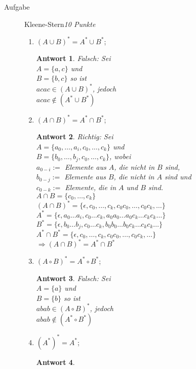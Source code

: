 \documentclass[a4paper,twoside,12pt,fleqn]{article}
\newcounter{AUFGNR}
\newcommand{\AUFGABE}[2]{\vspace{0.3cm}\item[Aufgabe~\arabic{AUFGNR}]\stepcounter{AUFGNR} #1\hfill\emph{#2}}
\newtheorem*{antwort}{Antwort}
\begin{document}
\begin{description}
\AUFGABE{Kleene-Stern}{10 Punkte}
\begin{enumerate}
  \item $(A \cup B)^* = A^* \cup B^*$;
    \begin{antwort}
      Falsch: Sei\\
      $A = \{a,c\}$ und\\
      $B = \{b,c\}$ so ist\\
      $acac \in (A \cup B)^*$, jedoch\\
      $acac \notin (A^* \cup B^*)$
    \end{antwort}
  \item $(A \cap B)^* = A^* \cap B^*$;
    \begin{antwort}
      Richtig: Sei\\
      $A = \{a_0, \dots, a_i, c_0, \dots, c_k\}$ und\\
      $B = \{b_0, \dots, b_j, c_0, \dots, c_k\}$, wobei\\
      $a_{0-i} :=$ Elemente aus $A$, die nicht in $B$ sind,\\
      $b_{0-j} :=$ Elemente aus $B$, die nicht in $A$ sind und\\
      $c_{0-k} :=$ Elemente, die in $A$ und $B$ sind.\\
      $A \cap B = \{c_0, \dots, c_k\}$\\
      $(A \cap B)^* = \{\epsilon, c_0, \dots, c_k, c_0c_0, \dots, c_0c_k, \dots\}$\\
      $A^* = \{\epsilon, a_0 \dots a_i, c_0 \dots c_k, a_0a_0 \dots
        a_0c_k \dots c_kc_k \dots\}$\\
      $B^* = \{\epsilon, b_0 \dots b_j, c_0 \dots c_k, b_0b_0 \dots
        b_0c_k \dots c_kc_k \dots\}$\\
      $A^* \cap B^* = \{\epsilon, c_0, \dots, c_k, c_0c_0, \dots, c_0c_k, \dots\}$\\
      $\Rightarrow (A \cap B)^* = A^* \cap B^*$
    \end{antwort}
  \item $(A  \circ B)^* = A^* \circ B^*$;
    \begin{antwort}
      Falsch: Sei\\
      $A = \{a\}$ und\\
      $B = \{b\}$ so ist\\
      $abab \in (A \circ B)^*$, jedoch\\
      $abab \notin (A^* \circ B^*)$
    \end{antwort}
  \item $(A^*)^* = A^*$;
    \begin{antwort}

\end{antwort}
\end{enumerate}
\end{description}
\end{document}
